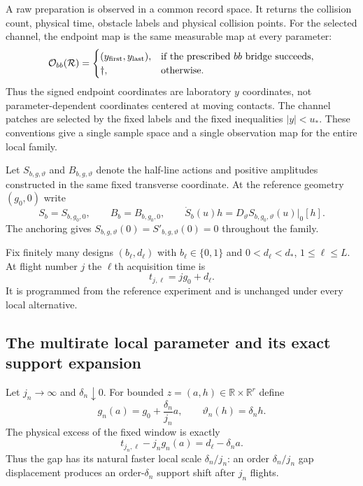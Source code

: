 A raw preparation is observed in a common record space.  It returns the
collision count, physical time, obstacle labels and physical collision
points.  For the selected channel, the endpoint map is the same measurable
map at every parameter:
\begin{equation}\label{eq:v21-laboratory-endpoint-map}
 \mathcal O_{bb}(\mathcal R)=
 \begin{cases}
 (y_{\rm first},y_{\rm last}),&\text{if the prescribed $bb$ bridge succeeds},\\
 \dagger,&\text{otherwise}.
 \end{cases}
\end{equation}
Thus the signed endpoint coordinates are laboratory $y$ coordinates, not
parameter-dependent coordinates centered at moving contacts.  The channel
patches are selected by the fixed labels and the fixed inequalities
$|y|<u_*$.  These conventions give a single sample space and a single
observation map for the entire local family.

Let $S_{b,g,\vartheta}$ and $B_{b,g,\vartheta}$ denote the half-line actions
and positive amplitudes constructed in the same fixed transverse coordinate.
At the reference geometry $(g_0,0)$ write
\[
 S_b=S_{b,g_0,0},\qquad B_b=B_{b,g_0,0},\qquad
 \dot S_b(u)h=D_\vartheta S_{b,g_0,\vartheta}(u)|_{0}[h].
\]
The anchoring gives $S_{b,g,\vartheta}(0)=S'_{b,g,\vartheta}(0)=0$ throughout
the family.

Fix finitely many designs $(b_\ell,d_\ell)$ with
$b_\ell\in\{0,1\}$ and $0<d_\ell<d_*$, $1\le\ell\le L$.  At flight number
$j$ the $\ell$th acquisition time is
\begin{equation}\label{eq:v21-fixed-physical-window}
                         t_{j,\ell}=jg_0+d_\ell.
\end{equation}
It is programmed from the reference experiment and is unchanged under every
local alternative.

\subsection{The multirate local parameter and its exact support expansion}

Let $j_n\to\infty$ and $\delta_n\downarrow0$.  For bounded
$z=(a,h)\in\mathbb R\times\mathbb R^r$ define
\begin{equation}\label{eq:v21-multirate-parameter}
 g_n(a)=g_0+\frac{\delta_n}{j_n}a,
 \qquad
 \vartheta_n(h)=\delta_nh.
\end{equation}
The physical excess of the fixed window is exactly
\begin{equation}\label{eq:v21-raw-excess}
 t_{j_n,\ell}-j_ng_n(a)=d_\ell-\delta_na.
\end{equation}
Thus the gap has its natural faster local scale $\delta_n/j_n$: an order
$\delta_n/j_n$ gap displacement produces an order-$\delta_n$ support shift
after $j_n$ flights.

